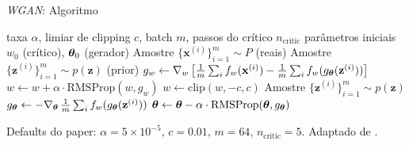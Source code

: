 \documentclass[aspectratio=169,xcolor=dvipsnames]{beamer}
\begin{document}
  \begin{frame}{\textit{WGAN}: Algoritmo}
    \small
    \begin{algorithmic}[1]
      \Require taxa $\alpha$, limiar de clipping $c$, batch $m$, passos do crítico $n_{\text{critic}}$
      \Require parâmetros iniciais $w_0$ (crítico), $\bm{\theta}_0$ (gerador)
          \State Amostre $\{\mathbf{x}^{(i)}\}_{i=1}^{m} \sim P$ (reais)
          \State Amostre $\{\mathbf{z}^{(i)}\}_{i=1}^{m} \sim p(\mathbf{z})$ (prior)
          \State $g_w \leftarrow \nabla_w \left[\tfrac{1}{m}\sum_i f_w(\mathbf{x}^{(i)}) - \tfrac{1}{m}\sum_i f_w(g_{\bm{\theta}}(\mathbf{z}^{(i)}))\right]$
          \State $w \leftarrow w + \alpha \cdot \mathrm{RMSProp}(w, g_w)$
          \State $w \leftarrow \mathrm{clip}(w, -c, c)$
        \EndFor
        \State Amostre $\{\mathbf{z}^{(i)}\}_{i=1}^{m} \sim p(\mathbf{z})$
        \State $g_{\bm{\theta}} \leftarrow -\nabla_{\bm{\theta}}\, \tfrac{1}{m}\sum_i f_w(g_{\bm{\theta}}(\mathbf{z}^{(i)}))$
        \State $\bm{\theta} \leftarrow \bm{\theta} - \alpha \cdot \mathrm{RMSProp}(\bm{\theta}, g_{\bm{\theta}})$
      \EndWhile
    \end{algorithmic}
    \vspace{0.3em}
    \tiny Defaults do paper: $\alpha = 5 \times 10^{-5}$, $c = 0.01$,
    $m = 64$, $n_{\text{critic}} = 5$.
    Adaptado de .
  \end{frame}
\end{document}
